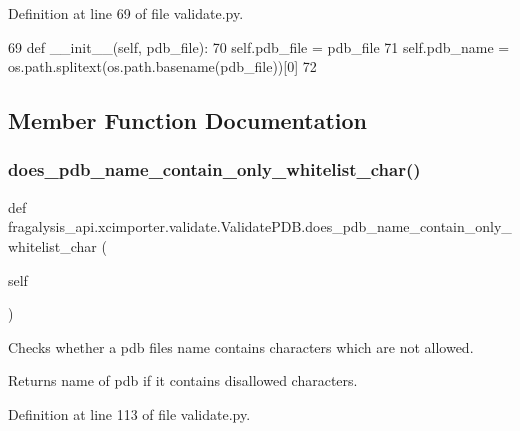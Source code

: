 Definition at line 69 of file validate.\+py.


\begin{DoxyCode}
69     \textcolor{keyword}{def }\_\_init\_\_(self, pdb\_file):
70         self.pdb\_file = pdb\_file
71         self.pdb\_name = os.path.splitext(os.path.basename(pdb\_file))[0]
72 
\end{DoxyCode}


\subsection{Member Function Documentation}
\mbox{\label{classfragalysis__api_1_1xcimporter_1_1validate_1_1_validate_p_d_b_a0775261c2b35a1f1861dabccbba32d02}} 
\subsubsection{\texorpdfstring{does\+\_\+pdb\+\_\+name\+\_\+contain\+\_\+only\+\_\+whitelist\+\_\+char()}{does\_pdb\_name\_contain\_only\_whitelist\_char()}}
{\footnotesize\ttfamily def fragalysis\+\_\+api.\+xcimporter.\+validate.\+Validate\+P\+D\+B.\+does\+\_\+pdb\+\_\+name\+\_\+contain\+\_\+only\+\_\+whitelist\+\_\+char (\begin{DoxyParamCaption}\item[{}]{self }\end{DoxyParamCaption})}



Checks whether a pdb files name contains characters which are not allowed. 

\begin{DoxyReturn}{Returns}
name of pdb if it contains disallowed characters. 
\end{DoxyReturn}


Definition at line 113 of file validate.\+py.


